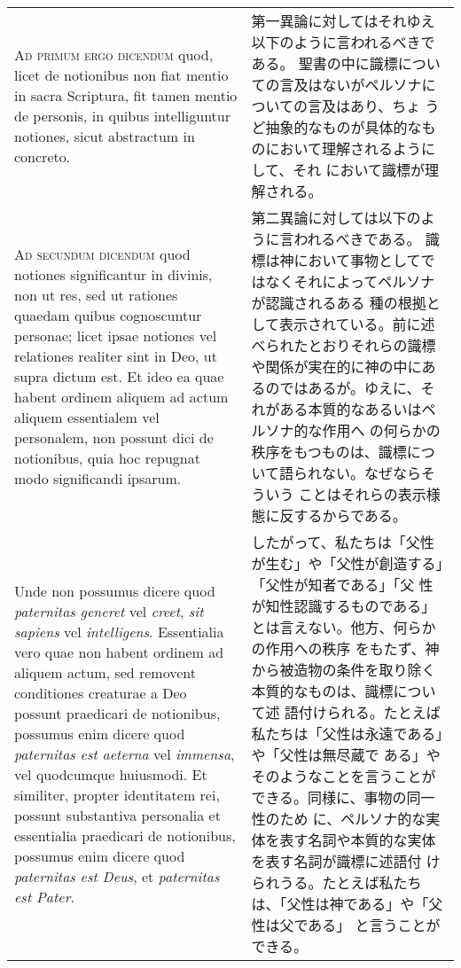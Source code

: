 \documentclass[10pt]{jsarticle} %
\begin{document}
\begin{longtable}{p{21em}p{21em}}
{\scshape Ad primum ergo dicendum} quod, licet de notionibus non fiat mentio in
sacra Scriptura, fit tamen mentio de personis, in quibus intelliguntur
notiones, sicut abstractum in concreto.


&

第一異論に対してはそれゆえ以下のように言われるべきである。
聖書の中に識標についての言及はないがペルソナについての言及はあり、ちょ
 うど抽象的なものが具体的なものにおいて理解されるようにして、それ
 において識標が理解される。


\\



{\scshape Ad secundum dicendum} quod notiones significantur in divinis, non ut
res, sed ut rationes quaedam quibus cognoscuntur personae; licet ipsae
notiones vel relationes realiter sint in Deo, ut supra dictum est. Et
ideo ea quae habent ordinem aliquem ad actum aliquem essentialem vel
personalem, non possunt dici de notionibus, quia hoc repugnat modo
significandi ipsarum. 

&

第二異論に対しては以下のように言われるべきである。
識標は神において事物としてではなくそれによってペルソナが認識されるある
 種の根拠として表示されている。前に述べられたとおりそれらの識標や関係が実在的に神の中にあ
 るのではあるが。ゆえに、それがある本質的なあるいはペルソナ的な作用へ
 の何らかの秩序をもつものは、識標について語られない。なぜならそういう
 ことはそれらの表示様態に反するからである。

\\

Unde non possumus dicere quod {\itshape paternitas generet}
vel {\itshape creet}, {\itshape sit sapiens} vel {\itshape intelligens}. Essentialia vero quae non
habent ordinem ad aliquem actum, sed removent conditiones creaturae a
Deo possunt praedicari de notionibus, possumus enim dicere quod
{\itshape paternitas est aeterna} vel {\itshape immensa}, vel quodcumque huiusmodi. Et
similiter, propter identitatem rei, possunt substantiva personalia et
essentialia praedicari de notionibus, possumus enim dicere quod
{\itshape paternitas est Deus}, et {\itshape paternitas est Pater}.


&

したがって、私たちは「父性が生む」や「父性が創造する」「父性が知者である」「父
 性が知性認識するものである」とは言えない。他方、何らかの作用への秩序
 をもたず、神から被造物の条件を取り除く本質的なものは、識標について述
 語付けられる。たとえば私たちは「父性は永遠である」や「父性は無尽蔵で
 ある」やそのようなことを言うことができる。同様に、事物の同一性のため
 に、ペルソナ的な実体を表す名詞や本質的な実体を表す名詞が識標に述語付
 けられうる。たとえば私たちは、「父性は神である」や「父性は父である」
 と言うことができる。



\end{longtable}
\end{document}
